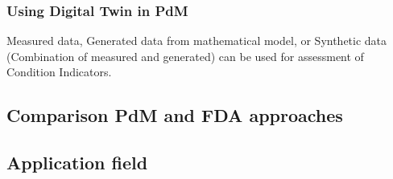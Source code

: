 \documentclass[class=article, crop=false]{standalone}
\begin{document}
\subsubsection{Using Digital Twin in PdM}

Measured data, Generated data from mathematical model, or Synthetic data
(Combination of measured and generated) can be used for assessment of
Condition Indicators. 


\subsection{Comparison PdM and FDA approaches}

\subsection{Application field}
\end{document}
